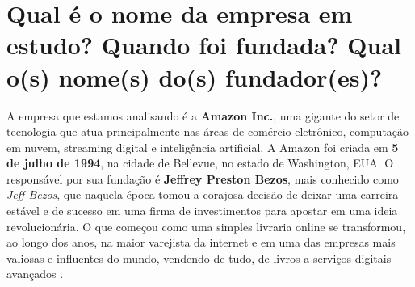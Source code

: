 \section{Qual é o nome da empresa em estudo? Quando foi fundada? Qual o(s) nome(s) do(s) fundador(es)?}

A empresa que estamos analisando é a \textbf{Amazon Inc.}, uma gigante do setor de tecnologia que atua principalmente nas áreas de comércio eletrônico, computação em nuvem, streaming digital e inteligência artificial. A Amazon foi criada em \textbf{5 de julho de 1994}, na cidade de Bellevue, no estado de Washington, EUA. O responsável por sua fundação é \textbf{Jeffrey Preston Bezos}, mais conhecido como \textit{Jeff Bezos}, que naquela época tomou a corajosa decisão de deixar uma carreira estável e de sucesso em uma firma de investimentos para apostar em uma ideia revolucionária. O que começou como uma simples livraria online se transformou, ao longo dos anos, na maior varejista da internet e em uma das empresas mais valiosas e influentes do mundo, vendendo de tudo, de livros a serviços digitais avançados \cite{bezosbiography2024}.